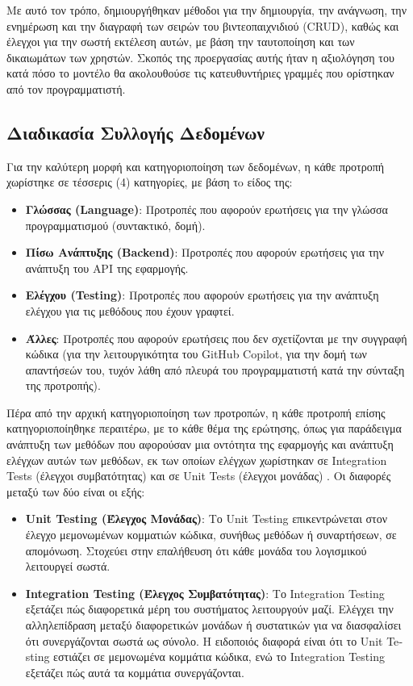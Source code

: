 Με αυτό τον τρόπο, δημιουργήθηκαν μέθοδοι για την δημιουργία, την
ανάγνωση, την ενημέρωση και την διαγραφή των σειρών του βιντεοπαιχνιδιού
\textlatin{(CRUD)}, καθώς και έλεγχοι για την σωστή εκτέλεση αυτών, με
βάση την ταυτοποίηση και των δικαιωμάτων των χρηστών. Σκοπός της
προεργασίας αυτής ήταν η αξιολόγηση του κατά πόσο το μοντέλο θα
ακολουθούσε τις κατευθυντήριες γραμμές που ορίστηκαν από τον
προγραμματιστή.

\subsection{Διαδικασία Συλλογής Δεδομένων}

Για την καλύτερη μορφή και κατηγοριοποίηση των δεδομένων, η κάθε
προτροπή χωρίστηκε σε τέσσερις (4) κατηγορίες, με βάση τo είδος της:

\begin{itemize}
\item
  \textbf{Γλώσσας (\textlatin{Language})}: Προτροπές που αφορούν
  ερωτήσεις για την γλώσσα προγραμματισμού (συντακτικό, δομή).
\item
  \textbf{Πίσω Ανάπτυξης (\textlatin{Backend})}: Προτροπές που αφορούν
  ερωτήσεις για την ανάπτυξη του \textlatin{API} της εφαρμογής.
\item
  \textbf{Ελέγχου (\textlatin{Testing})}: Προτροπές που αφορούν
  ερωτήσεις για την ανάπτυξη ελέγχου για τις μεθόδους που έχουν γραφτεί.
\item
  \textbf{Άλλες}: Προτροπές που αφορούν ερωτήσεις που δεν σχετίζονται με
  την συγγραφή κώδικα (για την λειτουργικότητα του \textlatin{GitHub
    Copilot}, για την δομή των απαντήσεών του, τυχόν λάθη από πλευρά του
  προγραμματιστή κατά την σύνταξη της προτροπής).
\end{itemize}

Πέρα από την αρχική κατηγοριοποίηση των προτροπών, η κάθε προτροπή
επίσης κατηγοριοποίηθηκε περαιτέρω, με το κάθε θέμα της ερώτησης, όπως
για παράδειγμα ανάπτυξη των μεθόδων που αφορούσαν μια οντότητα της
εφαρμογής και ανάπτυξη ελέγχων αυτών των μεθόδων, εκ των οποίων ελέγχων
χωρίστηκαν σε \textlatin{Integration Tests} (έλεγχοι συμβατότητας) και
σε \textlatin{Unit Tests} (έλεγχοι μονάδας) \cite{jamilTesting,
  Kathiriya}. Οι διαφορές μεταξύ των δύο είναι οι εξής:
\begin{itemize}
\item
  \textbf{\textlatin{Unit Testing} (Έλεγχος Μονάδας)}: Το
  \textlatin{Unit Testing} επικεντρώνεται στον έλεγχο μεμονωμένων
  κομματιών κώδικα, συνήθως μεθόδων ή συναρτήσεων, σε απομόνωση.
  Στοχεύει στην επαλήθευση ότι κάθε μονάδα του λογισμικού λειτουργεί
  σωστά.
\item
  \textbf{\textlatin{Integration Testing} (Έλεγχος Συμβατότητας)}: Το
  \textlatin{Integration Testing} εξετάζει πώς διαφορετικά μέρη του
  συστήματος λειτουργούν μαζί. Ελέγχει την αλληλεπίδραση μεταξύ
  διαφορετικών μονάδων ή συστατικών για να διασφαλίσει ότι συνεργάζονται
  σωστά ως σύνολο. Η ειδοποιός διαφορά είναι ότι το \textlatin{Unit
    Testing} εστιάζει σε μεμονωμένα κομμάτια κώδικα, ενώ το
  \textlatin{Integration Testing} εξετάζει πώς αυτά τα κομμάτια
  συνεργάζονται. \cite{patton2005software}
\end{itemize}

